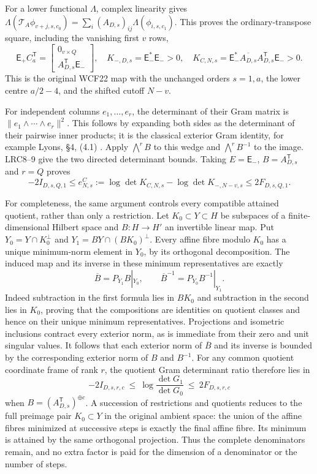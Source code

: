 For a lower functional $\Lambda$, complex linearity gives
$\Lambda(\mathcal T_A\phi_{v+j,s,c_0})
=\sum_i(A_{D,s})_{ij}\Lambda(\phi_{i,s,c_1})$.
This proves the ordinary-transpose square, including the vanishing
first $v$ rows,
\[
 \mathsf E_+C_a^{\mathsf T}
 =\begin{bmatrix}0_{v\times Q}\\A_{D,s}^{\mathsf T}\mathsf E_-\end{bmatrix},
 \quad K_{-,D,s}=\mathsf E_-^*\mathsf E_->0,\quad
 K_{C,N,s}=\mathsf E_-^*\overline{A_{D,s}}A_{D,s}^{\mathsf T}\mathsf E_->0.
                                                               \tag{LT25}
\]
This is the original WCF22 map with the unchanged orders $s=1,a$,
the lower centre $a/2-4$, and the shifted cutoff $N-v$.

For independent columns $e_1,\ldots,e_r$, the determinant of their
Gram matrix is $\|e_1\wedge\cdots\wedge e_r\|^2$. This follows
by expanding both sides as the determinant of their pairwise inner
products; it is the classical exterior Gram identity, for example
Lyons, \S4, (4.1) \cite{human:lyons2003}.
Apply $\bigwedge^r B$ to this wedge and $\bigwedge^r B^{-1}$
to the image. LRC8--9 give the two directed determinant bounds.
Taking $E=\mathsf E_-$, $B=A_{D,s}^{\mathsf T}$ and $r=Q$ proves
\[
 \boxed{-2I_{D,s,Q,1}\le e^C_{N,s}
 :=\log\det K_{C,N,s}-\log\det K_{-,N-v,s}
 \le2F_{D,s,Q,1}.}                                      \tag{LRC10}
\]

For completeness, the same argument controls every compatible attained
quotient, rather than only a restriction. Let $K_0\subset Y\subset H$
be subspaces of a finite-dimensional Hilbert space and $B:H\to H'$
an invertible linear map. Put
$Y_0=Y\cap K_0^\perp$ and $Y_1=BY\cap(BK_0)^\perp$.
Every affine fibre modulo $K_0$ has a unique minimum-norm element in
$Y_0$, by its orthogonal decomposition. The induced map and its inverse
in these minimum representatives are exactly
\[
 \overline B=P_{Y_1}B|_{Y_0},\qquad
 \overline B^{-1}=P_{Y_0}B^{-1}|_{Y_1}.                  \tag{LT26}
\]
Indeed subtraction in the first formula lies in $BK_0$ and subtraction
in the second lies in $K_0$, proving that the compositions are identities
on quotient classes and hence on their unique minimum representatives.
Projections and isometric inclusions contract every exterior norm,
as is immediate from their zero and unit singular values.
It follows that each exterior norm of $\overline B$ and its inverse
is bounded by the corresponding exterior norm of $B$ and $B^{-1}$.
For any common quotient coordinate frame of rank $r$, the quotient
Gram determinant ratio therefore lies in
\[
 -2I_{D,s,r,c}\ \le\ \log\frac{\det G_1}{\det G_0}
                    \ \le\ 2F_{D,s,r,c}                 \tag{LT27}
\]
when $B=(A_{D,s}^{\mathsf T})^{\oplus c}$.
A succession of restrictions and quotients reduces to the full
preimage pair $K_0\subset Y$ in the original ambient space: the
union of the affine fibres minimized at successive steps is exactly
the final affine fibre. Its minimum is attained by the same orthogonal
projection. Thus the complete denominators remain, and no extra factor
is paid for the dimension of a denominator or the number of steps.


